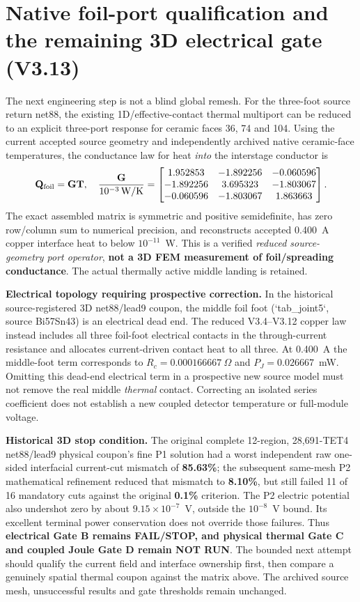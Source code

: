 \clearpage
\section{Native foil-port qualification and the remaining 3D electrical gate (V3.13)}
\label{sec:v313-native-ports}
The next engineering step is not a blind global remesh. For the three-foot source return net88, the existing 1D/effective-contact thermal multiport can be reduced to an explicit three-port response for ceramic faces 36, 74 and 104. Using the current accepted source geometry and independently archived native ceramic-face temperatures, the conductance law for heat \emph{into} the interstage conductor is
\[
\mathbf Q_{\rm foil}=\mathbf G\mathbf T,\quad
\frac{\mathbf G}{10^{-3}\,\mathrm{W/K}}=\begin{bmatrix}
1.952853&-1.892256&-0.060596\\
-1.892256&3.695323&-1.803067\\
-0.060596&-1.803067&1.863663
\end{bmatrix}.
\]
The exact assembled matrix is symmetric and positive semidefinite, has zero row/column sum to numerical precision, and reconstructs accepted 0.400~A copper interface heat to below \(10^{-11}\)~W. This is a verified \emph{reduced source-geometry port operator}, \textbf{not a 3D FEM measurement of foil/spreading conductance}. The actual thermally active middle landing is retained.

\textbf{Electrical topology requiring prospective correction.} In the historical source-registered 3D net88/lead9 coupon, the middle foil foot (`tab\_joint5`, source Bi57Sn43) is an electrical dead end. The reduced V3.4--V3.12 copper law instead includes all three foil-foot electrical contacts in the through-current resistance and allocates current-driven contact heat to all three. At 0.400~A the middle-foot term corresponds to \(R_{c}=0.000166667\ \Omega\) and \(P_{J}=0.026667\)~mW. Omitting this dead-end electrical term in a prospective new source model must not remove the real middle \emph{thermal} contact. Correcting an isolated series coefficient does not establish a new coupled detector temperature or full-module voltage.

\textbf{Historical 3D stop condition.} The original complete 12-region, 28,691-TET4 net88/lead9 physical coupon's fine P1 solution had a worst independent raw one-sided interfacial current-cut mismatch of \textbf{85.63\%}; the subsequent same-mesh P2 mathematical refinement reduced that mismatch to \textbf{8.10\%}, but still failed 11 of 16 mandatory cuts against the original \textbf{0.1\%} criterion. The P2 electric potential also undershot zero by about \(9.15\times10^{-7}\)~V, outside the \(10^{-8}\)~V bound. Its excellent terminal power conservation does not override those failures. Thus \textbf{electrical Gate B remains FAIL/STOP, and physical thermal Gate C and coupled Joule Gate D remain NOT RUN}. The bounded next attempt should qualify the current field and interface ownership first, then compare a genuinely spatial thermal coupon against the matrix above. The archived source mesh, unsuccessful results and gate thresholds remain unchanged.


